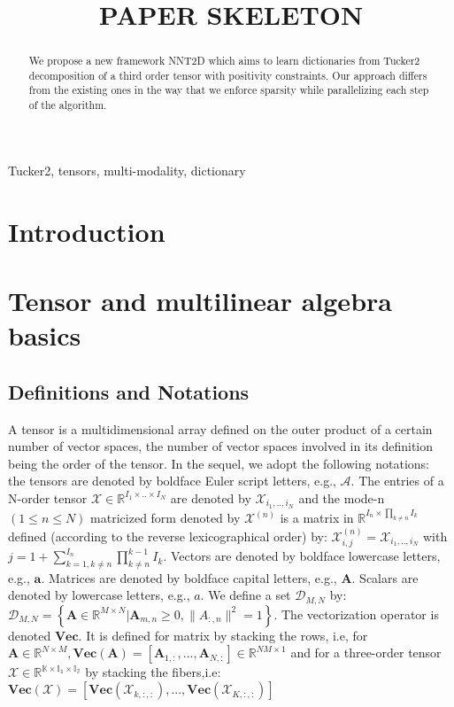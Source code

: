 \documentclass{article}
\title{PAPER SKELETON}
\def\tA{\boldsymbol{{\mathscr A}}}
\def\X{\boldsymbol{{\mathscr X}}}
\def\A{{\mathbf A}}
\begin{document}
 \maketitle
 \begin{abstract}
We propose a new framework NNT2D which aims to learn dictionaries from Tucker2 decomposition of a third order tensor with positivity constraints. Our approach differs from the existing ones in the way that we enforce sparsity while parallelizing each step of the algorithm.
 \end{abstract}
 \begin{keywords}
 Tucker2, tensors, multi-modality, dictionary
 \end{keywords}
 \section{Introduction}
 \label{sec:intro}
 
 
 
 \section{Tensor and multilinear algebra basics}
 \subsection{Definitions and Notations}
 \label{ssec:notation}
 
 A tensor is a multidimensional  array defined on the outer product of a certain number of vector spaces, the number of vector spaces involved in its definition being the order of the tensor. In the sequel, we adopt the following notations:\\
 the tensors  are denoted by boldface Euler script letters, e.g., $\tA$. The entries of a N-order tensor $\X\in\mathbb{R}^{I_{1}\times..\times I_{N}}$ are denoted by $\X_{i_{1},..,i_{N}}$ and the mode-n $(1\leq n\leq N)$ matricized form denoted by $\X^{(n)}$ is a matrix in $\mathbb{R}^{I_{n}\times \prod_{k\neq n}I_{k}}$ defined (according to the reverse lexicographical order) by: $\X^{(n)}_{i,j}=\X_{i_{1},..,i_{N}}$ with $j=1+\sum^{I_{n}}_{k=1,k\neq n}\prod^{k-1}_{k\neq n}I_{k}$.
 Vectors are denoted by boldface lowercase letters, e.g., $\mathbf{a}$. Matrices are denoted by boldface capital letters, e.g., $\A$.
 Scalars are denoted by lowercase letters, e.g., $a$. We define a set $\mathcal{D}_{M,N}$ by: $\mathcal{D}_{M,N}=\left\{\A\in\mathbb{R}^{M\times N}| \A_{m,n}\geq 0, \|A_{:,n}\|^{2}=1 \right\}$. The vectorization operator is denoted  $\textbf{Vec}$. It is defined for matrix by stacking the rows, i.e, for $\A\in\mathbb{R}^{N\times M}, \textbf{Vec}(\A)=[\A_{1,:},...,\A_{N,:}]\in\mathbb{R}^{NM\times 1}$ and for a three-order tensor $\X\in\mathbb{R^{K\times I_{1}\times I_{2}}}$ by stacking the fibers,i.e:\\
 $\textbf{Vec}(\X)=[\textbf{Vec}(\X_{k,:,:}),...,\textbf{Vec}(\X_{K,:,:})]$ 
 
\end{document}
